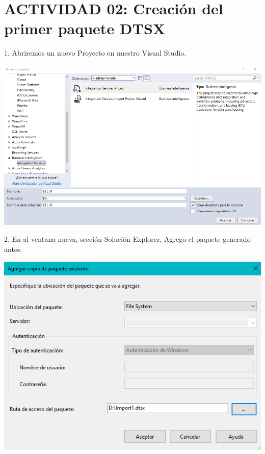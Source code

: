 \section{ACTIVIDAD 02: Creación del primer paquete DTSX}

1. Abriremos un nuevo Proyecto en nuestro Visual Studio.
	\begin{center}
	\includegraphics[width=\columnwidth]{images/task2/img13}
	\end{center}	

2. En al ventana nueva, sección Solución Explorer, Agrego el paquete generado antes.
	\begin{center}
	\includegraphics[width=\columnwidth]{images/task2/img14}
    \end{center}	
    
